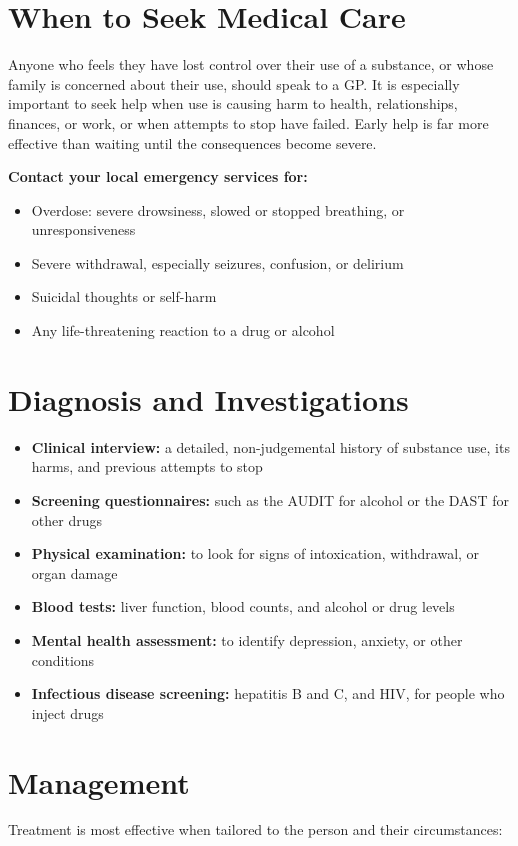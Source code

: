 \section*{When to Seek Medical Care}
Anyone who feels they have lost control over their use of a substance, or whose family is concerned about their use, should speak to a GP. It is especially important to seek help when use is causing harm to health, relationships, finances, or work, or when attempts to stop have failed. Early help is far more effective than waiting until the consequences become severe.

\textbf{Contact your local emergency services for:}
\begin{itemize}
    \item Overdose: severe drowsiness, slowed or stopped breathing, or unresponsiveness
    \item Severe withdrawal, especially seizures, confusion, or delirium
    \item Suicidal thoughts or self-harm
    \item Any life-threatening reaction to a drug or alcohol
\end{itemize}

\section*{Diagnosis and Investigations}
\begin{itemize}
    \item \textbf{Clinical interview:} a detailed, non-judgemental history of substance use, its harms, and previous attempts to stop
    \item \textbf{Screening questionnaires:} such as the AUDIT for alcohol or the DAST for other drugs
    \item \textbf{Physical examination:} to look for signs of intoxication, withdrawal, or organ damage
    \item \textbf{Blood tests:} liver function, blood counts, and alcohol or drug levels
    \item \textbf{Mental health assessment:} to identify depression, anxiety, or other conditions
    \item \textbf{Infectious disease screening:} hepatitis B and C, and HIV, for people who inject drugs
\end{itemize}

\section*{Management}
Treatment is most effective when tailored to the person and their circumstances:


